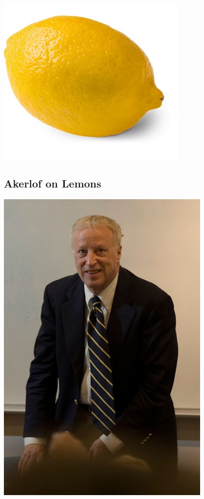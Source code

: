 \documentclass[
  letterpaper,
  DIV=11,
  numbers=noendperiod]{scrartcl}
\begin{document}
\includegraphics[width=0.71\textwidth,height=0.71\textheight]{lemon.jpg}

\subsection{Akerlof on Lemons}\label{akerlof-on-lemons-1}

\includegraphics[width=0.8\textwidth,height=0.8\textheight]{akerlof.jpg}
\end{document}
